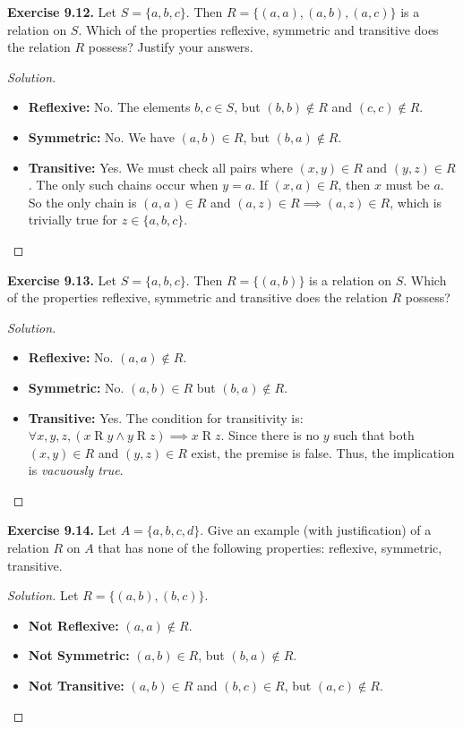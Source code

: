 \documentclass[11pt, a4paper]{article}
\theoremstyle{definition}
\theoremstyle{remark}
\begin{document}
\vspace{1em}
\textbf{Exercise 9.12.} Let $S = \{a, b, c\}$. Then $R = \{(a, a), (a, b), (a, c)\}$ is a relation on $S$. Which of the properties reflexive, symmetric and transitive does the relation $R$ possess? Justify your answers.
\begin{proof}[Solution]
\begin{itemize}
    \item \textbf{Reflexive:} No. The elements $b, c \in S$, but $(b, b) \notin R$ and $(c, c) \notin R$.
    \item \textbf{Symmetric:} No. We have $(a, b) \in R$, but $(b, a) \notin R$.
    \item \textbf{Transitive:} Yes. We must check all pairs where $(x, y) \in R$ and $(y, z) \in R$. The only such chains occur when $y = a$. If $(x, a) \in R$, then $x$ must be $a$. So the only chain is $(a, a) \in R$ and $(a, z) \in R \implies (a, z) \in R$, which is trivially true for $z \in \{a, b, c\}$.
\end{itemize}
\end{proof}

\vspace{1em}
\textbf{Exercise 9.13.} Let $S = \{a, b, c\}$. Then $R = \{(a, b)\}$ is a relation on $S$. Which of the properties reflexive, symmetric and transitive does the relation $R$ possess?
\begin{proof}[Solution]
\begin{itemize}
    \item \textbf{Reflexive:} No. $(a, a) \notin R$.
    \item \textbf{Symmetric:} No. $(a, b) \in R$ but $(b, a) \notin R$.
    \item \textbf{Transitive:} Yes. The condition for transitivity is: $\forall x, y, z, (x \mathrel{R} y \land y \mathrel{R} z) \implies x \mathrel{R} z$. Since there is no $y$ such that both $(x, y) \in R$ and $(y, z) \in R$ exist, the premise is false. Thus, the implication is \textit{vacuously true}.
\end{itemize}
\end{proof}

\vspace{1em}
\textbf{Exercise 9.14.} Let $A = \{a, b, c, d\}$. Give an example (with justification) of a relation $R$ on $A$ that has none of the following properties: reflexive, symmetric, transitive.
\begin{proof}[Solution]
Let $R = \{(a, b), (b, c)\}$.
\begin{itemize}
    \item \textbf{Not Reflexive:} $(a, a) \notin R$.
    \item \textbf{Not Symmetric:} $(a, b) \in R$, but $(b, a) \notin R$.
    \item \textbf{Not Transitive:} $(a, b) \in R$ and $(b, c) \in R$, but $(a, c) \notin R$.
\end{itemize}
\end{proof}
\end{document}
